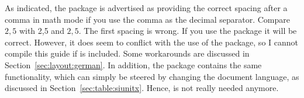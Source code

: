As indicated, the  package is advertised as providing
the correct spacing after a comma in math mode if you use the comma as
the decimal separator. Compare $2,5$ with 2,5 and $2{,}5$. The first
spacing is wrong. If you use the  package it will be
correct. However, it does seem to conflict with the use of the
 package, so I cannot compile this guide
if  is included. Some  workarounds are discussed in
Section~\ref{sec:layout:german}. In addition, the 
package contains the same functionality, which can simply be steered
by changing the document language, as discussed in
Section~\ref{sec:table:siunitx}. Hence,  is not really
needed anymore.
